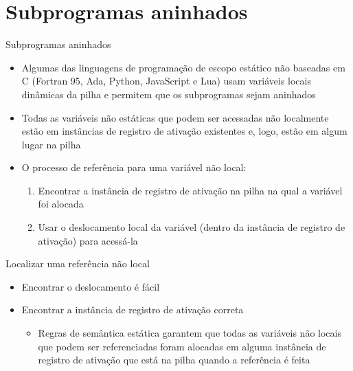 \documentclass[10pt]{beamer}
\begin{document}
\section{Subprogramas aninhados}

\begin{frame}{Subprogramas aninhados}
  
  \begin{itemize}
	\item Algumas das linguagens de programação de escopo estático não baseadas em C (Fortran 95, Ada, Python, JavaScript e Lua) usam variáveis locais dinâmicas da pilha e permitem que os subprogramas sejam aninhados
	\item Todas as variáveis não estáticas que podem ser acessadas não localmente estão em instâncias de registro de ativação existentes e, logo, estão em algum lugar na pilha
	\item O processo de referência para uma variável não local:
	\begin{enumerate}
		\item Encontrar a instância de registro de ativação na pilha na qual a variável foi alocada
		\item Usar o deslocamento local da variável (dentro da instância de registro de ativação) para acessá-la
	\end{enumerate}
\end{itemize}
  
\end{frame}

\begin{frame}{Localizar uma referência não local}

\begin{itemize}
	\item Encontrar o deslocamento é fácil
	\item Encontrar a instância de registro de ativação correta
	\begin{itemize}
		\item Regras de semântica estática garantem que todas as variáveis não locais que podem ser referenciadas foram alocadas em alguma instância de registro de ativação que está na pilha quando a referência é feita
	\end{itemize}
\end{itemize}

\end{frame}
\end{document}
